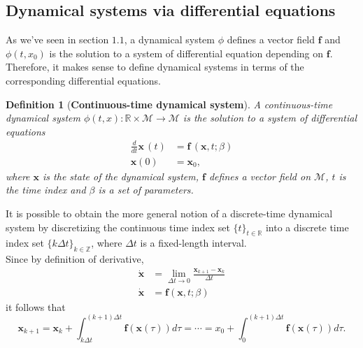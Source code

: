 \documentclass[]{article}
\newtheorem{definition}{Definition}
\begin{document}
\subsection{Dynamical systems via differential equations}
As we've seen in section $1.1$, a dynamical system $\phi$ defines a vector field $\textbf{f}$ and $\phi(t,x_0)$ is the solution to a system of differential equation depending on $\textbf{f}$. Therefore, it makes sense to define dynamical systems in terms of the corresponding differential equations.
\begin{definition}[\textbf{Continuous-time dynamical system}]
A continuous-time dynamical system $\phi(t,x) : \mathbb{R} \times \mathcal{M} \to \mathcal{M}$ is the solution to a system of differential equations
\begin{equation}
	\begin{split}
		\frac{d}{dt}\textbf{x}\,(t) & = \textbf{f}\,(\textbf{x},t;\beta) \\
		\textbf{x}(0) & = \textbf{x}_0,
	\end{split}
\end{equation}
where $\textbf{x}$ is the state of the dynamical system, $\textbf{f}$ defines a vector field on $\mathcal{M}$, $t$ is the time index and $\beta$ is a set of parameters.
\end{definition}
It is possible to obtain the more general notion of a discrete-time dynamical system by discretizing the continuous time index set $\{t\}_{t \in \mathbb{R}}$ into a discrete time index set $\{k\Delta t\}_{k \in \mathbb{Z}}$, where $\Delta t$ is a fixed-length interval. \\
Since by definition of derivative,
\begin{equation}
	\begin{split}
		\dot{\textbf{x}} & = \lim_{\Delta t \to 0}\frac{\textbf{x}_{k+1}-\textbf{x}_k}{\Delta t} \\
		\dot{\textbf{x}} & = \textbf{f}(\textbf{x},t;\beta)
	\end{split}
\end{equation}
it follows that
\begin{equation}
	\textbf{x}_{k+1} = \textbf{x}_k + \int_{k \Delta t}^{(k+1)\Delta t} \textbf{f}(\textbf{x}(\tau)) d\tau = \cdots = x_0+\int_0^{(k+1)\Delta t} \textbf{f}(\textbf{x}(\tau)) d\tau.
\end{equation}
\end{document}

